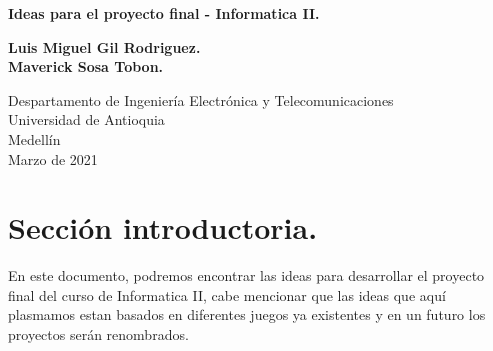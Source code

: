 \documentclass{article}
\begin{document}
\begin{titlepage}
    \begin{center}
        \vspace*{1cm}
            
        \Huge
        \textbf{Ideas para el proyecto final - Informatica II.}
            
        \vspace{0.5cm}
        \LARGE
            
        \vspace{1.5cm}
            
        \textbf{Luis Miguel Gil Rodriguez.}
        \\
        \textbf{Maverick Sosa Tobon.}
            
        \vfill
            
        \vspace{0.8cm}
            
        \Large
        Despartamento de Ingeniería Electrónica y Telecomunicaciones\\
        Universidad de Antioquia\\
        Medellín\\
        Marzo de 2021
            
    \end{center}
\end{titlepage}

\tableofcontents
\newpage
\section{Sección introductoria.}\label{intro}
En este documento, podremos encontrar las ideas para desarrollar el proyecto final del curso de Informatica II, cabe mencionar que las ideas que aquí plasmamos estan basados en diferentes juegos ya existentes y en un futuro los proyectos serán renombrados.
\end{document}
